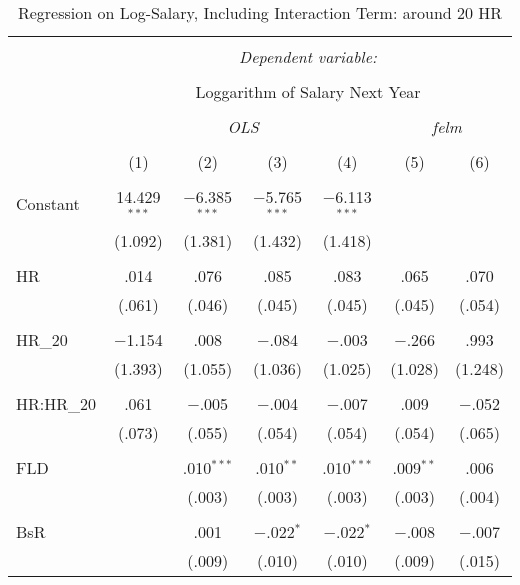 
\begin{table}[H] \centering
  \caption{Regression on Log-Salary, Including Interaction Term: around 20 HR}
  \label{HR20_A}
\tiny
\begin{tabular}{@{\extracolsep{5pt}}lcccccc}
\\[-1.8ex]\hline
\hline \\[-1.8ex]
 & \multicolumn{6}{c}{\textit{Dependent variable:}} \\
\cline{2-7}
\\[-1.8ex] & \multicolumn{6}{c}{Loggarithm of Salary Next Year} \\
\\[-1.8ex] & \multicolumn{4}{c}{\textit{OLS}} & \multicolumn{2}{c}{\textit{felm}} \\
\\[-1.8ex] & (1) & (2) & (3) & (4) & (5) & (6)\\
\hline \\[-1.8ex]
 Constant & 14.429$^{***}$ & $-$6.385$^{***}$ & $-$5.765$^{***}$ & $-$6.113$^{***}$ &  &  \\
  & (1.092) & (1.381) & (1.432) & (1.418) &  &  \\
  & & & & & & \\
 HR & .014 & .076 & .085 & .083 & .065 & .070 \\
  & (.061) & (.046) & (.045) & (.045) & (.045) & (.054) \\
  & & & & & & \\
 HR\_20 & $-$1.154 & .008 & $-$.084 & $-$.003 & $-$.266 & .993 \\
  & (1.393) & (1.055) & (1.036) & (1.025) & (1.028) & (1.248) \\
  & & & & & & \\
  HR:HR\_20 & .061 & $-$.005 & $-$.004 & $-$.007 & .009 & $-$.052 \\
  & (.073) & (.055) & (.054) & (.054) & (.054) & (.065) \\
  & & & & & & \\
 FLD &  & .010$^{***}$ & .010$^{**}$ & .010$^{***}$ & .009$^{**}$ & .006 \\
  &  & (.003) & (.003) & (.003) & (.003) & (.004) \\
  & & & & & & \\
 BsR &  & .001 & $-$.022$^{*}$ & $-$.022$^{*}$ & $-$.008 & $-$.007 \\
  &  & (.009) & (.010) & (.010) & (.009) & (.015) \\

\end{tabular}
\end{table}
